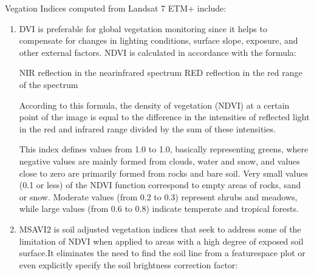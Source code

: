 \documentclass[letterpaper,10pt,english]{sphinxmanual}
\begin{document}
\sphinxAtStartPar
Vegation Indices computed from Landsat 7 ETM+ include:
\begin{enumerate}
%
\item {} 
\sphinxAtStartPar
{}

\sphinxAtStartPar
DVI is preferable for global vegetation monitoring since it helps to compensate for
changes in lighting conditions, surface slope, exposure, and other external factors.
NDVI is calculated in accordance with the formula:


\sphinxAtStartPar
NIR \textendash{} reflection in the near\sphinxhyphen{}infrared spectrum
RED \textendash{} reflection in the red range of the spectrum

\sphinxAtStartPar
According to this formula, the density of vegetation (NDVI) at a certain point of the
image is equal to the difference in the intensities of reflected light in the red and
infrared range divided by the sum of these intensities.

\sphinxAtStartPar
This index defines values ​​from \sphinxhyphen{}1.0 to 1.0, basically representing greens, where negative
values ​​are mainly formed from clouds, water and snow, and values ​​close to zero are
primarily formed from rocks and bare soil. Very small values ​​(0.1 or less) of the NDVI
function correspond to empty areas of rocks, sand or snow. Moderate values ​​(from 0.2 to 0.3)
represent shrubs and meadows, while large values ​​(from 0.6 to 0.8) indicate temperate and
tropical forests.

\item {} 
\sphinxAtStartPar
{}

\sphinxAtStartPar
MSAVI2 is soil adjusted vegetation indices that seek to address some of the limitation of
NDVI when applied to areas with a high degree of exposed soil surface.It eliminates the need
to find the soil line from a feature\sphinxhyphen{}space plot or even explicitly specify the soil brightness
correction factor:



\end{enumerate}
\end{document}
